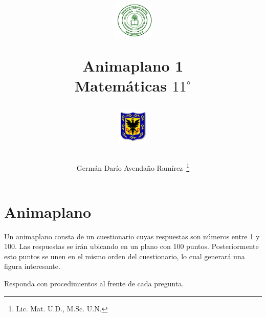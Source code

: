 \documentclass[11pt,twoside]{article}
\author{Germ\'an Dar\'io Avenda\~no Ram\'irez~\thanks{Lic. Mat. U.D., M.Sc. U.N.}}
\title{\begin{minipage}{0.2\textwidth}\includegraphics[height=1.7cm]{Images/logo-colegio.png}
\end{minipage}\hfill
\begin{minipage}{0.55\textwidth}\begin{center}
Animaplano 1\\Matemáticas $11^{\circ}$\end{center}
\end{minipage}
\begin{minipage}{.2\textwidth}
\includegraphics[height=1.7cm]{Images/logo-sed.png} 
\end{minipage}}
\date{}
\begin{document}
\maketitle

\section{Animaplano}
Un animaplano consta de un cuestionario cuyas respuestas son números entre 1 y 100. Las respuestas se irán ubicando en un plano con 100 puntos. Posteriormente esto puntos se unen en el mismo orden del cuestionario, lo cual generará una figura interesante.

Responda con procedimientos al frente de cada pregunta.
\end{document}
